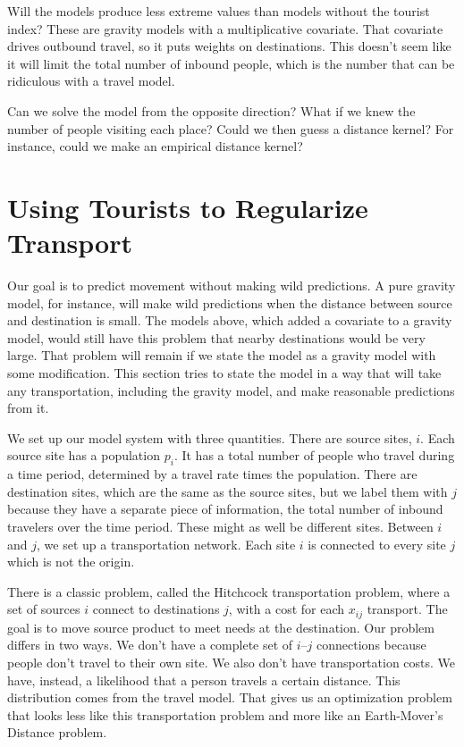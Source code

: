 \documentclass{article}
\begin{document}
Will the models produce less extreme values than models without the tourist index? These are gravity models with a multiplicative covariate. That covariate drives outbound travel, so it puts weights on destinations. This doesn't seem like it will limit the total number of inbound people, which is the number that can be ridiculous with a travel model.

Can we solve the model from the opposite direction? What if we knew the number of people visiting each place? Could we then guess a distance kernel? For instance, could we make an empirical distance kernel?

\section{Using Tourists to Regularize Transport}

Our goal is to predict movement without making wild predictions. A pure gravity model, for instance, will make wild predictions when the distance between source and destination is small. The models above, which added a covariate to a gravity model, would still have this problem that nearby destinations would be very large. That problem will remain if we state the model as a gravity model with some modification. This section tries to state the model in a way that will take any transportation, including the gravity model, and make reasonable predictions from it.

We set up our model system with three quantities. There are source sites, $i$. Each source site has a population $p_i$. It has a total number of people who travel during a time period, determined by a travel rate times the population. There are destination sites, which are the same as the source sites, but we label them with $j$ because they have a separate piece of information, the total number of inbound travelers over the time period. These might as well be different sites. Between $i$ and $j$, we set up a transportation network. Each site $i$ is connected to every site $j$ which is not the origin.

There is a classic problem, called the Hitchcock transportation problem, where a set of sources $i$ connect to destinations $j$, with a cost for each $x_{ij}$ transport. The goal is to move source product to meet needs at the destination. Our problem differs in two ways. We don't have a complete set of $i$--$j$ connections because people don't travel to their own site. We also don't have transportation costs. We have, instead, a likelihood that a person travels a certain distance. This distribution comes from the travel model. That gives us an optimization problem that looks less like this transportation problem and more like an Earth-Mover's Distance problem.
\end{document}
